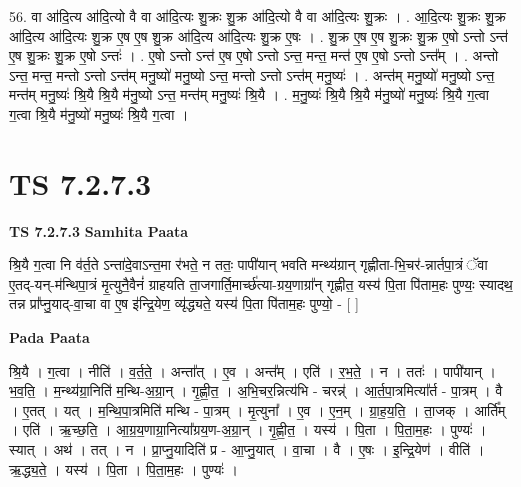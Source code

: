 \documentclass[17pt]{extarticle}
\begin{document}
56. वा आ॑दि॒त्य आ॑दि॒त्यो वै वा आ॑दि॒त्यः शु॒क्रः शु॒क्र आ॑दि॒त्यो वै वा आ॑दि॒त्यः शु॒क्रः । . आ॒दि॒त्यः शु॒क्रः शु॒क्र आ॑दि॒त्य आ॑दि॒त्यः शु॒क्र ए॒ष ए॒ष शु॒क्र आ॑दि॒त्य आ॑दि॒त्यः शु॒क्र ए॒षः । . शु॒क्र ए॒ष ए॒ष शु॒क्रः शु॒क्र ए॒षो ऽन्तो ऽन्त॑ ए॒ष शु॒क्रः शु॒क्र ए॒षो ऽन्तः॑ । . ए॒षो ऽन्तो ऽन्त॑ ए॒ष ए॒षो ऽन्तो ऽन्त॒ मन्त॒ मन्त॑ ए॒ष ए॒षो ऽन्तो ऽन्त᳚म् । . अन्तो ऽन्त॒ मन्त॒ मन्तो ऽन्तो ऽन्त॑म् मनु॒ष्यो॑ मनु॒ष्यो ऽन्त॒ मन्तो ऽन्तो ऽन्त॑म् मनु॒ष्यः॑ । . अन्त॑म् मनु॒ष्यो॑ मनु॒ष्यो ऽन्त॒ मन्त॑म् मनु॒ष्यः॑ श्रि॒यै श्रि॒यै म॑नु॒ष्यो ऽन्त॒ मन्त॑म् मनु॒ष्यः॑ श्रि॒यै । . म॒नु॒ष्यः॑ श्रि॒यै श्रि॒यै म॑नु॒ष्यो॑ मनु॒ष्यः॑ श्रि॒यै ग॒त्वा ग॒त्वा श्रि॒यै म॑नु॒ष्यो॑ मनु॒ष्यः॑ श्रि॒यै ग॒त्वा । \newline
\pagebreak
{}

\section{ TS 7.2.7.3 }

\textbf{TS 7.2.7.3 } \newline
\textbf{Samhita Paata} \newline

श्रि॒यै ग॒त्वा नि व॑र्त॒ते ऽन्ता॑दे॒वाऽन्त॒मा र॑भते॒ न ततः॒ पापी॑यान् भवति मन्थ्य॑ग्रान् गृह्णीता-भि॒चर॑-न्नार्तपा॒त्रं ॅवा ए॒तद्-यन्-म॑न्थिपा॒त्रं मृ॒त्युनै॒वैनं॑ ग्राहयति ता॒जगार्ति॒मार्च्छ॑त्या-ग्रय॒णाग्रा᳚न् गृह्णीत॒ यस्य॑ पि॒ता पि॑ताम॒हः पुण्यः॒ स्यादथ॒ तन्न प्रा᳚प्नु॒याद्-वा॒चा वा ए॒ष इ॑न्द्रि॒येण॒ व्यृ॑द्ध्यते॒ यस्य॑ पि॒ता पि॑ताम॒हः पुण्यो॒ - [  ] \newline

\textbf{Pada Paata} \newline

श्रि॒यै । ग॒त्वा । नीति॑ । व॒र्त॒ते॒ । अन्ता᳚त् । ए॒व । अन्त᳚म् । एति॑ । र॒भ॒ते॒ । न । ततः॑ । पापी॑यान् । भ॒व॒ति॒ । म॒न्थ्य॑ग्रा॒निति॑ म॒न्थि-अ॒ग्रा॒न् । गृ॒ह्णी॒त॒ । अ॒भि॒चर॒न्नित्य॑भि - चरन्न्॑ । आ॒र्त॒पा॒त्रमित्या᳚र्त - पा॒त्रम् । वै । ए॒तत् । यत् । म॒न्थि॒पा॒त्रमिति॑ मन्थि - पा॒त्रम् । मृ॒त्युना᳚ । ए॒व । ए॒न॒म् । ग्रा॒ह॒य॒ति॒ । ता॒जक् । आर्ति᳚म् । एति॑ । ऋ॒च्छ॒ति॒ । आ॒ग्र॒य॒णाग्रा॒नित्या᳚ग्रय॒ण-अ॒ग्रा॒न् । गृ॒ह्णी॒त॒ । यस्य॑ । पि॒ता । पि॒ता॒म॒हः । पुण्यः॑ । स्यात् । अथ॑ । तत् । न । प्रा॒प्नु॒यादिति॑ प्र - आ॒प्नु॒यात् । वा॒चा । वै । ए॒षः । इ॒न्द्रि॒येण॑ । वीति॑ । ऋ॒द्ध्य॒ते॒ । यस्य॑ । पि॒ता । पि॒ता॒म॒हः । पुण्यः॑ ।  \newline
\end{document}
